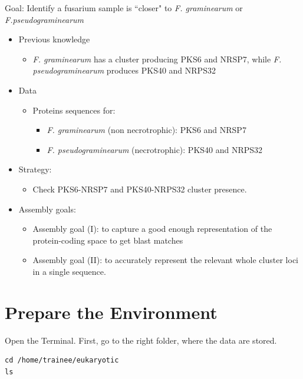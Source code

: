 \begin{information}
Goal: Identify a fusarium sample is ``closer" to \textit{F. graminearum} or \textit{F.pseudograminearum}
\begin{itemize}
	\item Previous knowledge
		\begin{itemize}
		\item \textit{F. graminearum} has a cluster producing PKS6 and NRSP7, while \textit{F. pseudograminearum} produces PKS40 and NRPS32
		\end{itemize}
	\item Data
		\begin{itemize}
		\item Proteins sequences for:
			\begin{itemize}
			\item \textit{F. graminearum} (non necrotrophic): PKS6 and NRSP7
			\item \textit{F. pseudograminearum} (necrotrophic): PKS40 and NRPS32
			\end{itemize}
		\end{itemize}
	\item Strategy:
		\begin{itemize}
		\item Check PKS6-NRSP7 and PKS40-NRPS32 cluster presence.
		\end{itemize}
	\item Assembly goals:
		\begin{itemize}
		\item Assembly goal (I): to capture a good enough representation of the protein-coding space to get blast matches
		\item Assembly goal (II): to accurately represent the relevant whole cluster loci in a single sequence.
		\end{itemize}
\end{itemize}

\end{information}

\section{Prepare the Environment}
\begin{steps}
Open the Terminal.
First, go to the right folder, where the data are stored.
\begin{lstlisting}
cd /home/trainee/eukaryotic
ls
\end{lstlisting}
\end{steps}

